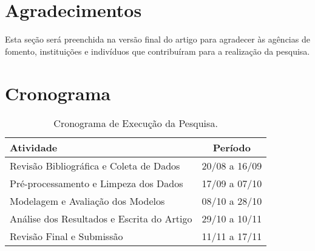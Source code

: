 \documentclass[english, brazilian]{RBIEarticle}
\begin{document}
\section*{Agradecimentos}
Esta seção será preenchida na versão final do artigo para agradecer às agências de fomento, instituições e indivíduos que contribuíram para a realização da pesquisa.

\section{Cronograma}
\begin{table}[h]
\centering
\caption{Cronograma de Execução da Pesquisa.}
\begin{tabular}{|l|c|}
\hline
\textbf{Atividade} & \textbf{Período} \\
\hline
Revisão Bibliográfica e Coleta de Dados & 20/08 a 16/09 \\
Pré-processamento e Limpeza dos Dados & 17/09 a 07/10 \\
Modelagem e Avaliação dos Modelos & 08/10 a 28/10 \\
Análise dos Resultados e Escrita do Artigo & 29/10 a 10/11 \\
Revisão Final e Submissão & 11/11 a 17/11 \\
\hline
\end{tabular}
\label{tab:cronograma}
\end{table}

\printbibliography
\end{document}
